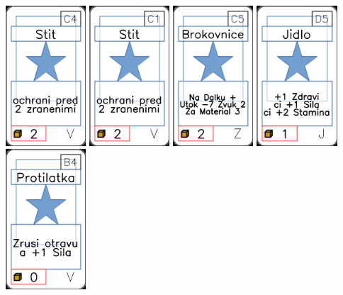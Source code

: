 \documentclass[a4paper]{article}
\begin{document}
	\includegraphics[width=3.0cm]{img-1_73}
	\includegraphics[width=3.0cm]{img-1_70}
	\includegraphics[width=3.0cm]{img-1_104}
	\includegraphics[width=3.0cm]{img-1_19}
	\includegraphics[width=3.0cm]{img-1_68}
\end{document}
